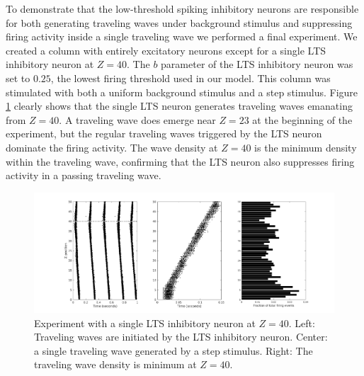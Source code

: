 \documentclass[a4paper,11pt]{article}
\begin{document}
To demonstrate that the low-threshold spiking inhibitory neurons are responsible for both generating traveling waves under background stimulus and suppressing firing activity inside a single traveling wave we performed a final experiment.
We created a column with entirely excitatory neurons except for a single LTS inhibitory neuron at $Z=40$.
The $b$ parameter of the LTS inhibitory neuron was set to $0.25$, the lowest firing threshold used in our model.
This column was stimulated with both a uniform background stimulus and a step stimulus. 
Figure \ref{fig:lts_inhibit} clearly shows that the single LTS neuron generates traveling waves emanating from $Z=40$. 
A traveling wave does emerge near $Z=23$ at the beginning of the experiment, but the regular traveling waves triggered by the LTS neuron dominate the firing activity.
The wave density at $Z=40$ is the minimum density within the traveling wave, confirming that the LTS neuron also suppresses firing activity in a passing traveling wave.
\begin{figure}[!htb]
 \caption{Experiment with a single LTS inhibitory neuron at $Z=40$. Left: Traveling waves are initiated by the LTS inhibitory neuron. Center: a single traveling wave generated by a step stimulus. Right: The traveling wave density is minimum at $Z=40$.}
 \label{fig:lts_inhibit}
 \centering
   \includegraphics[width=\textwidth]{fig/SingleLTSInhibit}
\end{figure}

\FloatBarrier
\end{document}
